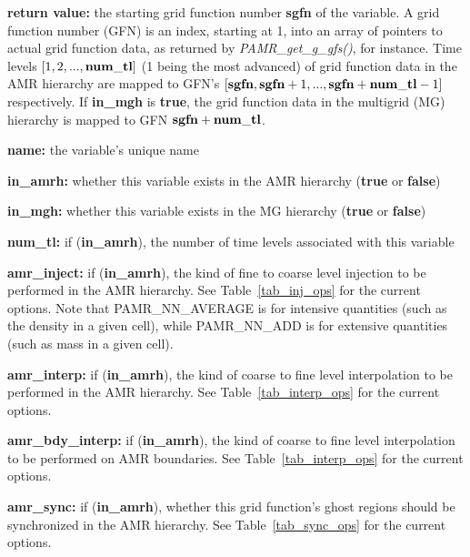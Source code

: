 \documentclass[aps,amssymb,unsortedaddress,nofootinbib]{revtex4}
\def\lsep{\itemsep 0.05in}
\begin{document}
\begin{list}{}{\lsep}
\item {\bf return value:} the starting grid function number {\bf sgfn} of the variable. 
          A grid function number (GFN) is
          an index, starting at 1, into an array of pointers to actual grid function
          data, as returned by {\em PAMR\_get\_g\_gfs()}, for instance. 
          Time levels $[1,2,...,\bf{num\_tl}]$ (1 being the most advanced) of grid function
          data in the AMR hierarchy are mapped to {GFN}'s 
          $[{\bf sgfn},{\bf sgfn}+1,...,{\bf sgfn}+{\bf num\_tl}-1]$
          respectively. If {\bf in\_mgh} is {\bf true}, the grid function data in the
          multigrid (MG) hierarchy is mapped to GFN ${\bf sgfn}+{\bf num\_tl}$.

\item {\bf name:} the variable's unique name 

\item {\bf in\_amrh:} whether this variable exists in the AMR hierarchy ({\bf true} or {\bf false}) 

\item {\bf in\_mgh:} whether this variable exists in the MG hierarchy ({\bf true} or {\bf false}) 

\item {\bf num\_tl:} if ({\bf in\_amrh}), the number of time levels associated with this variable 

\item {\bf amr\_inject:} if ({\bf in\_amrh}), the kind of fine to coarse level injection to be performed
          in the AMR hierarchy.
          See Table~\ref{tab_inj_ops} for the current options. Note that PAMR\_NN\_AVERAGE is for 
	  intensive quantities (such as the density in a given 
	  cell), while PAMR\_NN\_ADD is for extensive quantities (such as mass in a 
	  given cell).

\item {\bf amr\_interp:} if ({\bf in\_amrh}), the kind of coarse to fine level interpolation to be performed
          in the AMR hierarchy.
          See Table~\ref{tab_interp_ops} for the current options.  

\item {\bf amr\_bdy\_interp:} if ({\bf in\_amrh}), the kind of coarse to fine level interpolation to be performed
          on AMR boundaries. See Table~\ref{tab_interp_ops} for the current options. 

\item {\bf amr\_sync:} if ({\bf in\_amrh}), whether this grid function's ghost regions should be 
          synchronized in the AMR hierarchy.
          See Table~\ref{tab_sync_ops} for the current options. 


\end{list}
\end{document}
